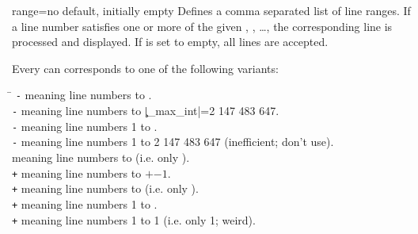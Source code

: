 \documentclass[a4paper,11pt]{ltxdoc}
\begin{document}
\begin{docCsvKey}[][doc new=2021-06-29]{range}{=}{no default, initially empty}
  Defines a comma separated list of line ranges. If a line number 
  satisfies one or more of the given , , \ldots,
  the corresponding line is processed and displayed.
  If  is set to empty, all lines are accepted.

  Every  can
  corresponds to one of the following variants:
  \begin{tabbing}
  \hspace*{2cm}\=\kill
  \texttt{-} \> meaning line numbers  to .\\
  \texttt{-}         \> meaning line numbers  to |\c_max_int|=2 147 483 647.\\
  \texttt{-}         \> meaning line numbers 1 to .\\
  \texttt{-}                 \> meaning line numbers 1 to 2 147 483 647 (inefficient; don't use).\\
  \texttt{}          \> meaning line numbers  to  (i.e. only ).\\
  \texttt{+} \> meaning line numbers  to $+$$-1$.\\
  \texttt{+}         \> meaning line numbers  to  (i.e. only ).\\
  \texttt{+}         \> meaning line numbers 1 to .\\
  \texttt{+}                 \> meaning line numbers 1 to 1 (i.e. only 1; weird).\\
  \end{tabbing}

\begin{dispExample}
\end{dispExample}


\begin{dispExample}
\end{dispExample}



\end{docCsvKey}
\end{document}
